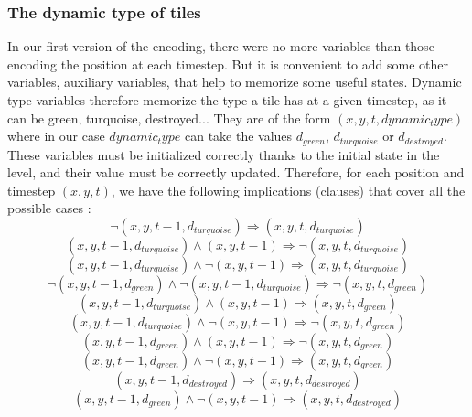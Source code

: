\documentclass[a4paper, 12pt, titlepage]{article}
\begin{document}
\subsubsection{The dynamic type of tiles}
In our first version of the encoding, there were no more variables than those
encoding the position at each timestep. But it is convenient to add some other
variables, auxiliary variables, that help to memorize some useful states.
Dynamic type variables therefore memorize the type a tile has at a given
timestep, as it can be green, turquoise, destroyed... They are of the form
$(x, y, t, dynamic_type)$ where in our case $dynamic_type$ can take the values
$d_{green}$, $d_{turquoise}$ or $d_{destroyed}$. These variables must be
initialized correctly thanks to the initial state in the level, and their value
must be correctly updated. Therefore, for each position and timestep
$(x, y, t)$, we have the following implications (clauses) that cover all the
possible cases :
\begin{equation}
\neg(x, y, t-1, d_{turquoise}) \Rightarrow (x, y, t, d_{turquoise})
\end{equation}
\begin{equation}
(x, y, t-1, d_{turquoise}) \wedge (x, y, t-1) \Rightarrow
					      \neg(x, y, t, d_{turquoise})
\end{equation}
\begin{equation}
(x, y, t-1, d_{turquoise}) \wedge \neg(x, y, t-1) \Rightarrow
						  (x, y, t, d_{turquoise})
\end{equation}
\begin{equation}
\neg(x, y, t-1, d_{green}) \wedge \neg(x, y, t-1, d_{turquoise}) \Rightarrow
							\neg(x, y, t, d_{green})
\end{equation}
\begin{equation}
(x, y, t-1, d_{turquoise}) \wedge (x, y, t-1) \Rightarrow (x, y, t, d_{green})
\end{equation}
\begin{equation}
(x, y, t-1, d_{turquoise}) \wedge \neg(x, y, t-1) \Rightarrow
						  \neg(x, y, t, d_{green})
\end{equation}
\begin{equation}
(x, y, t-1, d_{green}) \wedge (x, y, t-1) \Rightarrow \neg(x, y, t, d_{green})
\end{equation}
\begin{equation}
(x, y, t-1, d_{green}) \wedge \neg(x, y, t-1) \Rightarrow (x, y, t, d_{green})
\end{equation}
\begin{equation}
(x, y, t-1, d_{destroyed}) \Rightarrow (x, y, t, d_{destroyed})
\end{equation}
\begin{equation}
(x, y, t-1, d_{green}) \wedge \neg(x, y, t-1) \Rightarrow
					      (x, y, t, d_{destroyed})
\end{equation}
\end{document}
